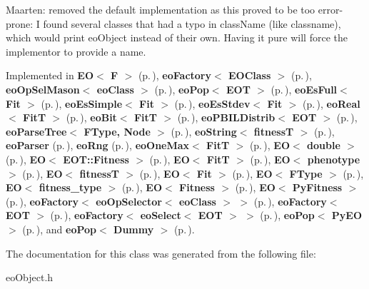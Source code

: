 Maarten: removed the default implementation as this proved to be too error-prone: I found several classes that had a typo in class\-Name (like classname), which would print eo\-Object instead of their own. Having it pure will force the implementor to provide a name. 

Implemented in {\bf EO$<$ F $>$} {\rm (p.\,\pageref{class_e_o_z10_0})}, {\bf eo\-Factory$<$ EOClass $>$} {\rm (p.\,\pageref{classeo_factory_z13_0})}, {\bf eo\-Op\-Sel\-Mason$<$ eo\-Class $>$} {\rm (p.\,\pageref{classeo_op_sel_mason_z17_0})}, {\bf eo\-Pop$<$ EOT $>$} {\rm (p.\,\pageref{classeo_pop_z19_1})}, {\bf eo\-Es\-Full$<$ Fit $>$} {\rm (p.\,\pageref{classeo_es_full_a1})}, {\bf eo\-Es\-Simple$<$ Fit $>$} {\rm (p.\,\pageref{classeo_es_simple_a1})}, {\bf eo\-Es\-Stdev$<$ Fit $>$} {\rm (p.\,\pageref{classeo_es_stdev_a1})}, {\bf eo\-Real$<$ Fit\-T $>$} {\rm (p.\,\pageref{classeo_real_a1})}, {\bf eo\-Bit$<$ Fit\-T $>$} {\rm (p.\,\pageref{classeo_bit_a1})}, {\bf eo\-PBILDistrib$<$ EOT $>$} {\rm (p.\,\pageref{classeo_p_b_i_l_distrib_a6})}, {\bf eo\-Parse\-Tree$<$ FType, Node $>$} {\rm (p.\,\pageref{classeo_parse_tree_a4})}, {\bf eo\-String$<$ fitness\-T $>$} {\rm (p.\,\pageref{classeo_string_z26_0})}, {\bf eo\-Parser} {\rm (p.\,\pageref{classeo_parser_a4})}, {\bf eo\-Rng} {\rm (p.\,\pageref{classeo_rng_a18})}, {\bf eo\-One\-Max$<$ Fit\-T $>$} {\rm (p.\,\pageref{classeo_one_max_a2})}, {\bf EO$<$ double $>$} {\rm (p.\,\pageref{class_e_o_z10_0})}, {\bf EO$<$ EOT::Fitness $>$} {\rm (p.\,\pageref{class_e_o_z10_0})}, {\bf EO$<$ Fit\-T $>$} {\rm (p.\,\pageref{class_e_o_z10_0})}, {\bf EO$<$ phenotype $>$} {\rm (p.\,\pageref{class_e_o_z10_0})}, {\bf EO$<$ fitness\-T $>$} {\rm (p.\,\pageref{class_e_o_z10_0})}, {\bf EO$<$ Fit $>$} {\rm (p.\,\pageref{class_e_o_z10_0})}, {\bf EO$<$ FType $>$} {\rm (p.\,\pageref{class_e_o_z10_0})}, {\bf EO$<$ fitness\_\-type $>$} {\rm (p.\,\pageref{class_e_o_z10_0})}, {\bf EO$<$ Fitness $>$} {\rm (p.\,\pageref{class_e_o_z10_0})}, {\bf EO$<$ Py\-Fitness $>$} {\rm (p.\,\pageref{class_e_o_z10_0})}, {\bf eo\-Factory$<$ eo\-Op\-Selector$<$ eo\-Class $>$ $>$} {\rm (p.\,\pageref{classeo_factory_z13_0})}, {\bf eo\-Factory$<$ EOT $>$} {\rm (p.\,\pageref{classeo_factory_z13_0})}, {\bf eo\-Factory$<$ eo\-Select$<$ EOT $>$ $>$} {\rm (p.\,\pageref{classeo_factory_z13_0})}, {\bf eo\-Pop$<$ Py\-EO $>$} {\rm (p.\,\pageref{classeo_pop_z19_1})}, and {\bf eo\-Pop$<$ Dummy $>$} {\rm (p.\,\pageref{classeo_pop_z19_1})}.

The documentation for this class was generated from the following file:\begin{CompactItemize}
\item 
eo\-Object.h\end{CompactItemize}
